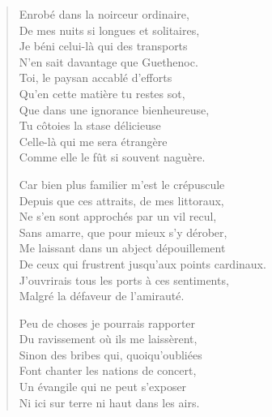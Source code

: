 \begin{verse}\dizain\huitain\sizain\neuvain\quintil\septain\quatrain
  Enrobé dans la noirceur ordinaire,\\  %
  De mes nuits si longues et solitaires,\\   %
  Je béni celui-là qui des transports\\   %
  N’en sait davantage que Guethenoc.\\   %
  Toi, le paysan accablé d’efforts\\   %
  Qu’en cette matière tu restes sot,\\   %
  Que dans une ignorance bienheureuse,\\   %
  Tu côtoies la stase délicieuse\\   %
  Celle-là qui me sera étrangère\\   %
  Comme elle le fût si souvent naguère. 

  Car bien plus familier m’est le crépuscule\\   %
  Depuis que ces attraits, de mes littoraux,\\  %
  Ne s’en sont approchés par un vil recul,\\  %
  Sans amarre, que pour mieux s’y dérober,\\  %
  Me laissant dans un abject dépouillement\\  %
  De ceux qui frustrent jusqu’aux points cardinaux. \\ 
  J’ouvrirais tous les ports à ces sentiments,\\  %
  Malgré la défaveur de l’amirauté. 

  Peu de choses je pourrais rapporter\\  %
  Du ravissement où ils me laissèrent,\\  %
  Sinon des bribes qui, quoiqu’oubliées\\  %
  Font chanter les nations de concert,\\  %
  Un évangile qui ne peut s’exposer\\  %
  Ni ici sur terre ni haut dans les airs. 


\end{verse}
